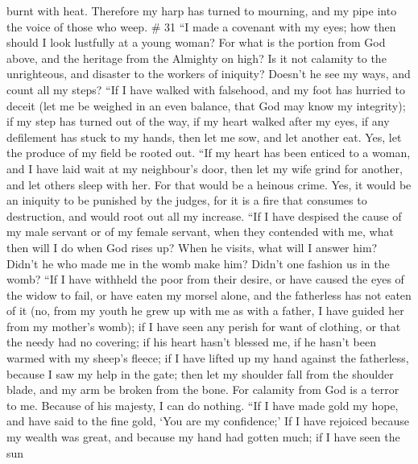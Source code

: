 burnt with heat.  Therefore my harp has turned to
mourning, and my pipe into the voice of those who weep. \# 31
 ``I made a covenant with my eyes; how then should I look
lustfully at a young woman?  For what is the portion from
God above, and the heritage from the Almighty on high?  Is
it not calamity to the unrighteous, and disaster to the workers of
iniquity?  Doesn't he see my ways, and count all my steps?
 ``If I have walked with falsehood, and my foot has
hurried to deceit  (let me be weighed in an even balance,
that God may know my integrity);  if my step has turned
out of the way, if my heart walked after my eyes, if any defilement has
stuck to my hands,  then let me sow, and let another eat.
Yes, let the produce of my field be rooted out.  ``If my
heart has been enticed to a woman, and I have laid wait at my
neighbour's door,  then let my wife grind for another,
and let others sleep with her.  For that would be a
heinous crime. Yes, it would be an iniquity to be punished by the
judges,  for it is a fire that consumes to destruction,
and would root out all my increase.  ``If I have despised
the cause of my male servant or of my female servant, when they
contended with me,  what then will I do when God rises
up? When he visits, what will I answer him?  Didn't he
who made me in the womb make him? Didn't one fashion us in the womb?
 ``If I have withheld the poor from their desire, or have
caused the eyes of the widow to fail,  or have eaten my
morsel alone, and the fatherless has not eaten of it 
(no, from my youth he grew up with me as with a father, I have guided
her from my mother's womb);  if I have seen any perish
for want of clothing, or that the needy had no covering; 
if his heart hasn't blessed me, if he hasn't been warmed with my sheep's
fleece;  if I have lifted up my hand against the
fatherless, because I saw my help in the gate;  then let
my shoulder fall from the shoulder blade, and my arm be broken from the
bone.  For calamity from God is a terror to me. Because
of his majesty, I can do nothing.  ``If I have made gold
my hope, and have said to the fine gold, `You are my confidence;'
 If I have rejoiced because my wealth was great, and
because my hand had gotten much;  if I have seen the sun
